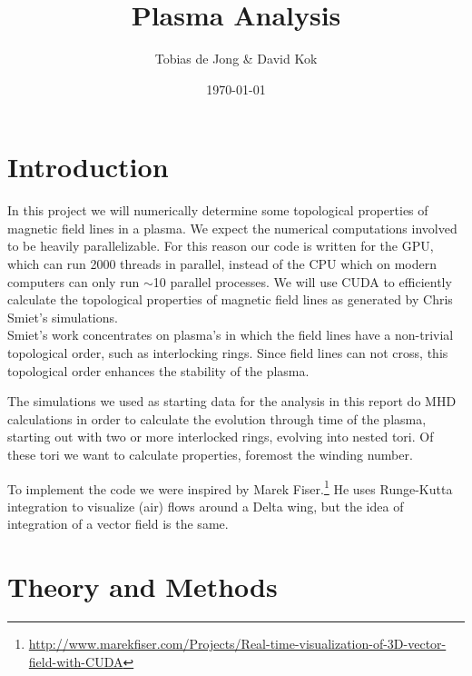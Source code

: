 \documentclass{article}
\begin{document}
\title{Plasma Analysis}
\author{Tobias de Jong \& David Kok}
\date{\today}
\maketitle

\section{Introduction}
In this project we will numerically determine some topological properties of magnetic field lines in a plasma. We expect the numerical computations involved to be heavily parallelizable. For this reason our code is written for the GPU, which can run 2000 threads in parallel, instead of the CPU which on modern computers can only run $\sim$10 parallel processes. We will use CUDA to efficiently calculate the topological properties of magnetic field lines as generated by Chris Smiet's simulations.\cite{PhysRevLett.115.095001}\\
Smiet's work concentrates on plasma's in which the field lines have a non-trivial topological order, such as interlocking rings. Since field lines can not cross, this topological order enhances the stability of the plasma.

The simulations we used as starting data for the analysis in this report do MHD calculations in order to calculate the evolution through time of the plasma, starting out with two or more interlocked rings, evolving into nested tori.
Of these tori we want to calculate properties, foremost the winding number.

To implement the code we were inspired by Marek Fiser.\footnote{\url{http://www.marekfiser.com/Projects/Real-time-visualization-of-3D-vector-field-with-CUDA}} He uses Runge-Kutta integration to visualize (air) flows around a Delta wing, but the idea of integration of a vector field is the same.

\section{Theory and Methods}
\end{document}
